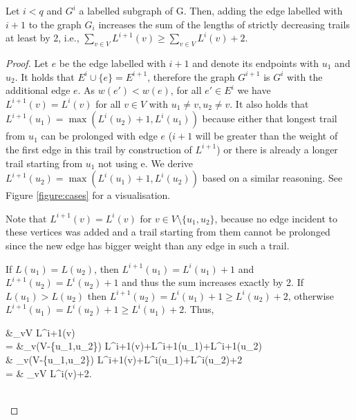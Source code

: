 \begin{isabellebody}
\begin{isamarkuptext}
\begin{lemma}\label{lemma:sum}
	Let $i < q$ and $G^i$ a labelled subgraph of G. Then, adding the edge labelled with $i+1$ to the 
graph $G_i$ increases the sum of the lengths of strictly decreasing trails at least by 2, i.e.,
	$\sum_{v\in V} L^{i+1}(v) \ge \sum_{v\in V} L^{i}(v)+2$.
\end{lemma}
\vspace{-1em}
\begin{proof}
Let $e$ be the edge labelled with $i+1$ and denote its endpoints with $u_1$ and $u_2$. It holds that $E^i \cup \{e\} = E^{i+1}$, 
therefore the graph $G^{i+1}$ is $G^i$ with the additional edge $e$. As $w(e') < w(e) $, for all $e' \in E^i$ we have 
 $L^{i+1}(v) = L^i(v)$ for all $v\in V$ with $u_1\neq v, u_2\neq v$. It also holds that $L^{i+1}(u_1) = \max(L^i(u_2)+1,L^i(u_1))$ 
because either that longest trail from $u_1$ can be prolonged with edge $e$ ($i+1$ will be greater than the weight of the first edge 
in this trail by construction of $L^{i+1}$) or there is already a longer trail starting from $u_1$ not using e. 
We derive $L^{i+1}(u_2) = \max(L^i(u_1)+1,L^i(u_2))$ based on a similar reasoning. See Figure \ref{figure:cases} for a visualisation. 

Note that $L^{i+1}(v) = L^i(v)$ for $v\in V \setminus \{u_1,u_2\}$, because no edge incident to these vertices was added and
a trail starting from them cannot be prolonged since the new edge has bigger weight than any edge in such a 
trail.

If $L(u_1)=L(u_2)$, then $L^{i+1}(u_1) = L^i(u_1) + 1$ and $L^{i+1}(u_2) = L^i(u_2)+1$ and thus the sum increases exactly by 2. 
If $L(u_1)>L(u_2)$ then $L^{i+1}(u_2) = L^i(u_1) +1 \ge L^i(u_2)+2$, otherwise $L^{i+1}(u_1) = L^i(u_2) +1 \ge L^i(u_1)+2$. Thus, 

\begin{flalign*}
&\sum_{v\in V} L^{i+1}(v) \\
= &\sum_{v\in (V-\{u_1,u_2\})} L^{i+1}(v)+L^{i+1}(u_1)+L^{i+1}(u_2)\\
\ge & \sum_{v\in (V-\{u_1,u_2\})} L^{i+1}(v)+L^i(u_1)+L^i(u_2)+2\\
= & \sum_{v\in V} L^{i}(v)+2.
\end{flalign*}\\

\end{proof}

\begin{figure}[h]
	\centering
\end{figure}
\end{isamarkuptext}
\end{isabellebody}
